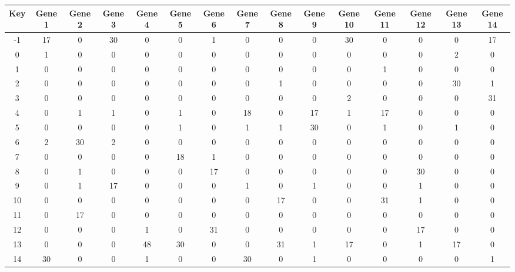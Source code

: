 \begin{tabular}{|c|c|c|c|c|c|c|c|c|c|c|c|c|c|c|}
\hline
Key & Gene 1 & Gene 2 & Gene 3 & Gene 4 & Gene 5 & Gene 6 & Gene 7 & Gene 8 & Gene 9 & Gene 10 & Gene 11 & Gene 12 & Gene 13 & Gene 14 \\
\hline
-1 & 17 & 0 & 30 & 0 & 0 & 1 & 0 & 0 & 0 & 30 & 0 & 0 & 0 & 17 \\
0 & 1 & 0 & 0 & 0 & 0 & 0 & 0 & 0 & 0 & 0 & 0 & 0 & 2 & 0 \\
1 & 0 & 0 & 0 & 0 & 0 & 0 & 0 & 0 & 0 & 0 & 1 & 0 & 0 & 0 \\
2 & 0 & 0 & 0 & 0 & 0 & 0 & 0 & 1 & 0 & 0 & 0 & 0 & 30 & 1 \\
3 & 0 & 0 & 0 & 0 & 0 & 0 & 0 & 0 & 0 & 2 & 0 & 0 & 0 & 31 \\
4 & 0 & 1 & 1 & 0 & 1 & 0 & 18 & 0 & 17 & 1 & 17 & 0 & 0 & 0 \\
5 & 0 & 0 & 0 & 0 & 1 & 0 & 1 & 1 & 30 & 0 & 1 & 0 & 1 & 0 \\
6 & 2 & 30 & 2 & 0 & 0 & 0 & 0 & 0 & 0 & 0 & 0 & 0 & 0 & 0 \\
7 & 0 & 0 & 0 & 0 & 18 & 1 & 0 & 0 & 0 & 0 & 0 & 0 & 0 & 0 \\
8 & 0 & 1 & 0 & 0 & 0 & 17 & 0 & 0 & 0 & 0 & 0 & 30 & 0 & 0 \\
9 & 0 & 1 & 17 & 0 & 0 & 0 & 1 & 0 & 1 & 0 & 0 & 1 & 0 & 0 \\
10 & 0 & 0 & 0 & 0 & 0 & 0 & 0 & 17 & 0 & 0 & 31 & 1 & 0 & 0 \\
11 & 0 & 17 & 0 & 0 & 0 & 0 & 0 & 0 & 0 & 0 & 0 & 0 & 0 & 0 \\
12 & 0 & 0 & 0 & 1 & 0 & 31 & 0 & 0 & 0 & 0 & 0 & 17 & 0 & 0 \\
13 & 0 & 0 & 0 & 48 & 30 & 0 & 0 & 31 & 1 & 17 & 0 & 1 & 17 & 0 \\
14 & 30 & 0 & 0 & 1 & 0 & 0 & 30 & 0 & 1 & 0 & 0 & 0 & 0 & 1 \\
\hline
\end{tabular}